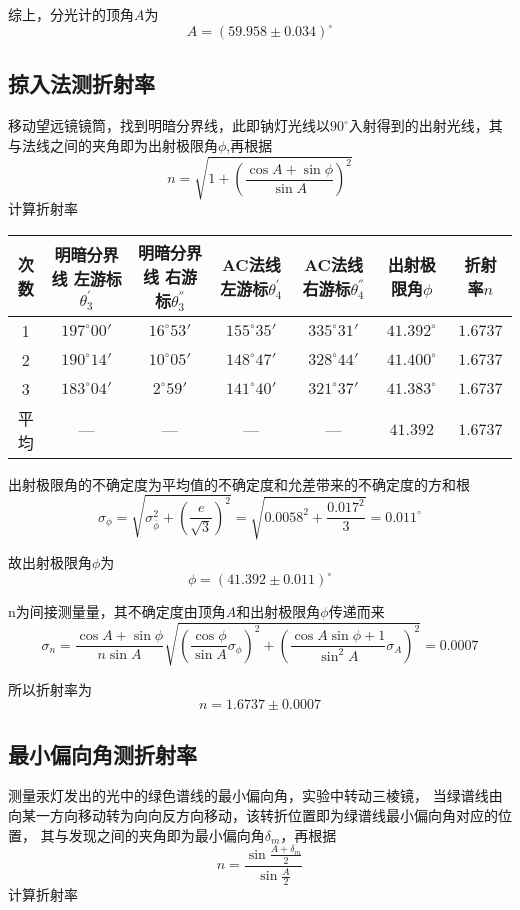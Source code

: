 \documentclass{article}
\newcommand{\degree}{^\circ}
\begin{document}
    综上，分光计的顶角$A$为$$A=(59.958\pm0.034)\degree$$

    \subsection{掠入法测折射率}
    移动望远镜镜筒，找到明暗分界线，此即钠灯光线以$90\degree$入射得到的出射光线，其与法线之间的夹角即为出射极限角$\phi$,再根据
    $$n=\sqrt{1+(\frac{\cos A+\sin\phi}{\sin A})^2}$$计算折射率

    \begin{center}    
    \begin{tabular}{|c|c|c|c|c|c|c|}
        \hline
        次数 & \makecell[c]{明暗分界线\\左游标$\theta_3^{'}$} & \makecell[c]{明暗分界线\\右游标$\theta_3^{''}$} & \makecell[c]{AC法线\\左游标$\theta_4^{'}$} & \makecell[c]{AC法线\\右游标$\theta_4^{''}$} & 出射极限角$\phi$ & 折射率$n$ \\
        \hline
        1 & $197\degree00'$ & $16\degree53'$ & $155\degree35'$ & $335\degree31'$ & $41.392\degree$ & $1.6737$ \\
        \hline
        2 & $190\degree14'$ & $10\degree05'$ & $148\degree47'$ & $328\degree44'$ & $41.400\degree$ & $1.6737$ \\
        \hline
        3 & $183\degree04'$ & $2\degree59'$ & $141\degree40'$ & $321\degree37'$ & $41.383\degree$ & $1.6737$ \\
        \hline
        平均 & --- & --- & --- & --- & $41.392$ & $1.6737$ \\
        \hline
    \end{tabular}
    \end{center}

    出射极限角的不确定度为平均值的不确定度和允差带来的不确定度的方和根
    $$\sigma_\phi=\sqrt{\sigma_{\bar{\phi}}^2+(\frac{e}{\sqrt{3}})^2}=\sqrt{0.0058^2+\frac{0.017^2}{3}}=0.011\degree$$

    故出射极限角$\phi$为
    $$\phi = (41.392\pm 0.011) \degree$$

    n为间接测量量，其不确定度由顶角$A$和出射极限角$\phi$传递而来
    $$\sigma_n = \frac{\cos A + \sin \phi}{n \sin A}\sqrt{(\frac{\cos \phi}{\sin A}\sigma_\phi)^2 + (\frac{\cos A \sin \phi +1}{\sin^2 A}\sigma_A)^2}=0.0007$$
    
    所以折射率为
    $$n=1.6737\pm0.0007$$

    \subsection{最小偏向角测折射率}
    测量汞灯发出的光中的绿色谱线的最小偏向角，实验中转动三棱镜，
    当绿谱线由向某一方向移动转为向向反方向移动，该转折位置即为绿谱线最小偏向角对应的位置，
    其与发现之间的夹角即为最小偏向角$\delta_m$，再根据
    $$n=\frac{\sin \frac{A+\delta_m}{2}}{\sin\frac{A}{2}}$$计算折射率
\end{document}
